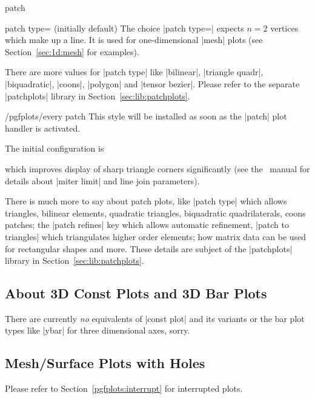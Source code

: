 {\begin{plottype}[/pgfplots]{patch}
\begin{pgfplotskey}{patch type= (initially default)}
	The choice |patch type=| expects $n=2$ vertices which make up a line. It is used for one-dimensional |mesh| plots (see Section~\ref{sec:1d:mesh} for examples).

	There are more values for |patch type| like |bilinear|, |triangle quadr|, |biquadratic|, |coons|, |polygon| and |tensor bezier|. Please refer to the separate |patchplots| library in Section~\ref{sec:lib:patchplots}.
\end{pgfplotskey}

\begin{stylekey}{/pgfplots/every patch}
	This style will be installed as soon as the |patch| plot handler is activated. 

	The initial configuration is
\begin{codeexample}
\end{codeexample}
	\noindent which improves display of sharp triangle corners significantly (see the \Tikz\ manual for details about |miter limit| and line join parameters).
\end{stylekey}

	There is much more to say about patch plots, like |patch type| which allows triangles, bilinear elements, quadratic triangles, biquadratic quadrilaterals, coons patches; the |patch refines| key which allows automatic refinement, |patch to triangles| which triangulates higher order elements;  how matrix data can be used for rectangular shapes and more. These details are subject of the |patchplots| library in Section~\ref{sec:lib:patchplots}.
\end{plottype}

\subsection{About 3D Const Plots and 3D Bar Plots}
There are currently \emph{no} equivalents of |const plot| and its variants or the bar plot types like |ybar| for three dimensional axes, sorry.

\subsection{Mesh/Surface Plots with Holes}
Please refer to Section~\ref{pgfplots:interrupt} for interrupted plots.

}

